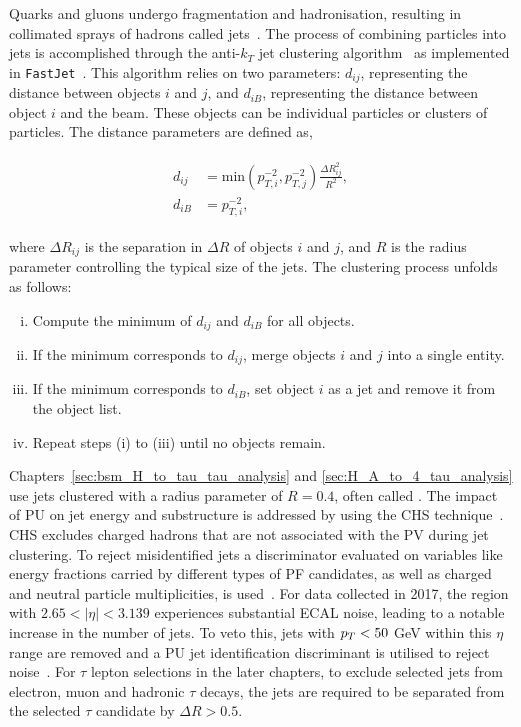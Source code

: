 Quarks and gluons undergo fragmentation and hadronisation, resulting in collimated sprays of hadrons called jets~\cite{Salam:2010nqg}. 
The process of combining particles into jets is accomplished through the anti-$k_T$ jet clustering algorithm~\cite{Cacciari:2008gp} as implemented in \texttt{FastJet}~\cite{Cacciari:2011ma}. 
This algorithm relies on two  parameters: $d_{ij}$, representing the distance between objects $i$ and $j$, and $d_{iB}$, representing the distance between object $i$ and the beam. 
These objects can be individual particles or clusters of particles. 
The distance parameters are defined as,

\begin{align}
\begin{split}
d_{ij} &= \text{min}(p_{T,i}^{-2}, p_{T,j}^{-2})  \frac{\Delta R_{ij}^{2}}{R^{2}}, \\ 
d_{iB} &= p_{T,i}^{-2}, 
\end{split}
\end{align} 
 
where $\Delta R_{ij}$ is the separation in $\Delta R$ of objects $i$ and $j$, and $R$ is the radius parameter controlling the typical size of the jets. 
The clustering process unfolds as follows:

\begin{enumerate}[i)]
\item Compute the minimum of $d_{ij}$ and $d_{iB}$ for all objects.
\item If the minimum corresponds to $d_{ij}$, merge objects $i$ and $j$ into a single entity.
\item If the minimum corresponds to $d_{iB}$, set object $i$ as a jet and remove it from the object list.
\item Repeat steps (i) to (iii) until no objects remain. 
\end{enumerate}

Chapters~\ref{sec:bsm_H_to_tau_tau_analysis} and \ref{sec:H_A_to_4_tau_analysis} use jets clustered with a radius parameter of $R = 0.4$, often called .
The impact of \ac{PU} on jet energy and substructure is addressed by using the \ac{CHS} technique~\cite{CMS:2017wyc}. 
\ac{CHS} excludes charged hadrons that are not associated with the \ac{PV} during jet clustering. 
To reject misidentified jets a discriminator evaluated on variables like energy fractions carried by different types of \ac{PF} candidates, as well as charged and neutral particle multiplicities, is used~\cite{CMS:2017wyc}. 
For data collected in 2017, the region with $2.65 < |\eta| < 3.139$ experiences substantial \ac{ECAL} noise, leading to a notable increase in the number of jets. 
To veto this, jets with $p_{T} < 50$ GeV within this $\eta$ range are removed and a \ac{PU} jet identification discriminant is utilised to reject noise~\cite{CMS:2013wea}.
For $\tau$ lepton selections in the later chapters, to exclude selected jets from electron, muon and hadronic $\tau$ decays, the jets are required to be separated from the selected $\tau$ candidate by $\Delta R > 0.5$.

